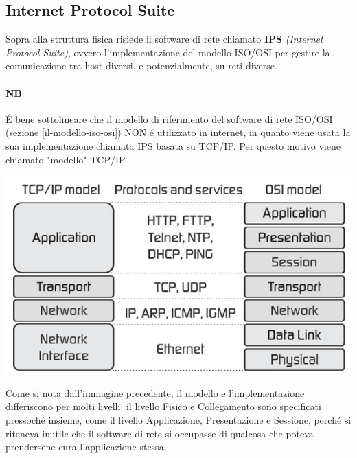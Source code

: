 \documentclass[12pt]{article}
\begin{document}
\subsection{Internet Protocol Suite}\label{internet-protocol-suite}
Sopra alla struttura fisica risiede il software di rete chiamato \textbf{IPS} \textit{(Internet Protocol Suite)}, ovvero 
l'implementazione del modello ISO/OSI per gestire la comunicazione tra host diversi, e potenzialmente, su reti diverse.

\paragraph{NB} \'E bene sottolineare che il modello di riferimento del software di rete ISO/OSI (sezione \ref{il-modello-iso-osi}) 
\underline{NON} \'e utilizzato in internet, in quanto viene usata la sua implementazione chiamata IPS basata su TCP/IP. Per questo 
motivo viene chiamato "modello" TCP/IP.

\begin{center}
	\includegraphics[scale=0.8]{introduzione-img18b.png}
\end{center}

Come si nota dall'immagine precedente, il modello e l'implementazione differiscono per molti livelli: il livello Fisico e 
Collegamento sono specificati pressoch\'e insieme, come il livello Applicazione, Presentazione e Sessione, perch\'e si riteneva 
inutile che il software di rete si occupasse di qualcosa che poteva prendersene cura l'applicazione stessa.

\clearpage
\end{document}
